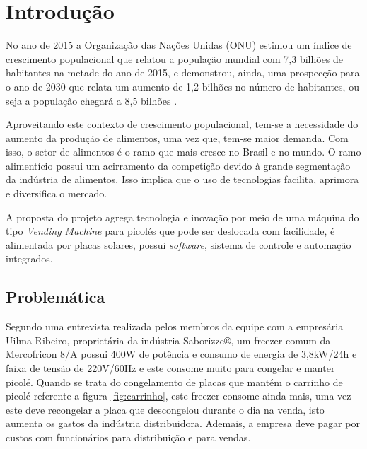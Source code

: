 \chapter{Introdução}

 No ano de 2015 a Organização das Nações Unidas (ONU) estimou um índice  de crescimento populacional que relatou a população mundial com 7,3 bilhões de habitantes na metade do ano de 2015, e  demonstrou, ainda, uma prospecção para o ano de 2030 que relata um aumento de 1,2 bilhões no número de habitantes, ou seja a população chegará a
8,5 bilhões \cite {ONU}. 

Aproveitando este contexto de crescimento populacional, tem-se a necessidade do aumento da produção de alimentos, uma vez que, tem-se maior demanda. Com isso, o setor de alimentos é o ramo que mais cresce no Brasil e no mundo. O ramo alimentício possui um acirramento da competição 
devido à grande segmentação da indústria de alimentos. Isso implica que o uso de tecnologias facilita, aprimora e diversifica o mercado. \cite{IBIA}

A proposta do projeto agrega tecnologia e inovação por meio de uma máquina do tipo \textit{Vending Machine} para picolés que pode ser deslocada com facilidade, é alimentada por placas solares, possui \textit{software}, sistema de controle e automação integrados.

\section{Problemática}

Segundo uma entrevista realizada pelos membros da equipe com a empresária Uilma Ribeiro, proprietária da indústria Saborizze®, um freezer comum da Mercofricon 8/A possui 400W de potência e consumo de energia de 3,8kW/24h e faixa de tensão de 220V/60Hz e este consome muito para congelar e manter picolé. Quando se trata do congelamento de placas que mantém o carrinho de picolé referente a figura \ref{fig:carrinho}, este freezer consome ainda mais, uma vez este deve recongelar a placa que descongelou durante o dia na venda, isto aumenta os gastos da indústria distribuidora. Ademais, a empresa deve pagar por custos com funcionários para distribuição e para vendas. 

